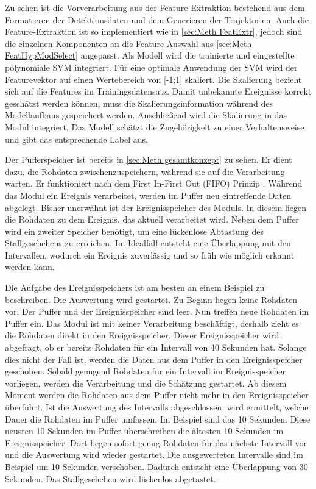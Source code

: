 Zu sehen ist die Vorverarbeitung aus der Feature-Extraktion bestehend aus dem Formatieren  der Detektionsdaten und dem Generieren der Trajektorien. Auch die Feature-Extraktion ist so implementiert wie in \autoref{sec:Meth FeatExtr}, jedoch sind die einzelnen Komponenten an die Feature-Auswahl aus \autoref{sec:Meth FeatHypModSelect} angepasst. Als Modell wird die trainierte und eingestellte polynomiale SVM integriert. Für eine optimale Anwendung der SVM wird der Featurevektor auf einen Wertebereich von [-1;1] skaliert. Die Skalierung bezieht sich auf die Features im Trainingsdatensatz. Damit unbekannte Ereignisse korrekt geschätzt werden können, muss die Skalierungsinformation während des Modellaufbaus gespeichert werden. Anschließend wird die Skalierung in das Modul integriert. Das Modell schätzt die Zugehörigkeit zu einer Verhaltensweise und gibt das entsprechende Label aus.\par

Der Pufferspeicher ist bereits in \autoref{sec:Meth gesamtkonzept} zu sehen. Er dient dazu, die Rohdaten zwischenzuspeichern, während sie auf die Verarbeitung warten. Er funktioniert nach dem First In-First Out (\acrshort{FIFO}) Prinzip \cite{Sedgewick.2011}. Während das Modul ein Ereignis verarbeitet, werden im Puffer neu eintreffende Daten abgelegt. Bisher unerwähnt ist der Ereignisspeicher des Moduls. In diesem liegen die Rohdaten zu dem Ereignis, das aktuell verarbeitet wird. Neben dem Puffer wird ein zweiter Speicher benötigt, um eine lückenlose Abtastung des Stallgeschehens zu erreichen. Im Idealfall entsteht eine Überlappung mit den Intervallen, wodurch ein Ereignis zuverlässig und so früh wie möglich erkannt werden kann. \par

Die Aufgabe des Ereignisspeichers ist am besten an einem Beispiel zu beschreiben. Die Auswertung wird gestartet. Zu Beginn liegen keine Rohdaten vor. Der Puffer und der Ereignisspeicher sind leer. Nun treffen neue Rohdaten im Puffer ein. Das Modul ist mit keiner Verarbeitung beschäftigt, deshalb zieht es die Rohdaten direkt in den Ereignisspeicher. Dieser Ereignisspeicher wird abgefragt, ob er bereits Rohdaten für ein Intervall von 40 Sekunden hat. Solange dies nicht der Fall ist, werden die Daten aus dem Puffer in den Ereignisspeicher geschoben. Sobald genügend Rohdaten für ein Intervall im Ereignisspeicher vorliegen, werden die Verarbeitung und die Schätzung gestartet. Ab diesem Moment werden die Rohdaten aus dem Puffer nicht mehr in den Ereignisspeicher überführt. Ist die Auswertung des Intervalls abgeschlossen, wird ermittelt, welche Dauer die Rohdaten im Puffer umfassen. Im Beispiel sind das 10 Sekunden. Diese neusten 10 Sekunden im Puffer überschreiben die ältesten 10 Sekunden im Ereignisspeicher. Dort liegen sofort genug Rohdaten für das nächste Intervall vor und die Auswertung wird wieder gestartet. Die ausgewerteten Intervalle sind im Beispiel um 10 Sekunden verschoben. Dadurch entsteht eine Überlappung von 30 Sekunden. Das Stallgeschehen wird lückenlos abgetastet. \par

